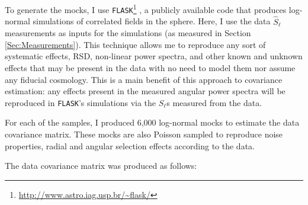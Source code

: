 \qquad To generate the mocks, I use \texttt{FLASK}\footnote{\url{http://www.astro.iag.usp.br/~flask/}} \citep{Flask2016}, a publicly available code that produces log-normal simulations of correlated fields in the sphere. Here, I use the data $\hat{S}_{\ell}$ measurements as inputs for the simulations (as measured in Section \ref{Sec:Measurements}). This technique allows me to reproduce any sort of systematic effects, RSD, non-linear power spectra, and other known and unknown effects that may be present in the data with no need to model them nor assume any fiducial cosmology. This is a main benefit of this approach to covariance estimation: any effects present in the measured angular power spectra will be reproduced in \texttt{FLASK}'s simulations via the $S_{\ell}$s measured from the data. 

\qquad For each of the samples, I produced 6,000 log-normal mocks to estimate the data covariance matrix. These mocks are also Poisson sampled to reproduce noise properties, radial and angular selection effects according to the data. 

\qquad The data covariance matrix was produced as follows:

